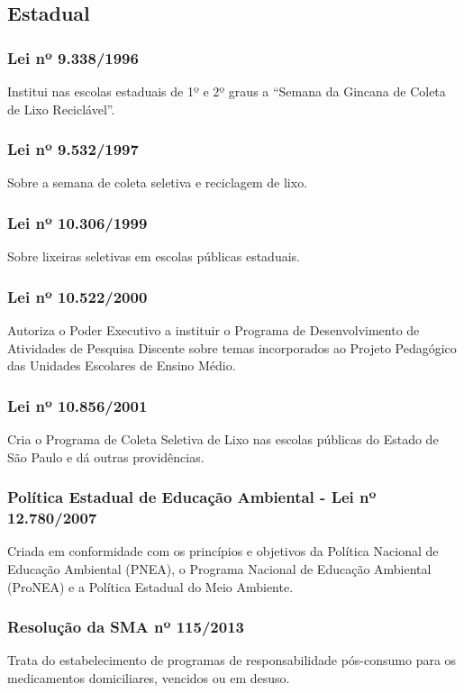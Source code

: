 \begin{subapend}
	\subsection{Estadual}
	\begin{subsubapend}
		\item \subsubsection{Lei nº 9.338/1996}
		Institui nas escolas estaduais de 1º e 2º graus a “Semana da Gincana de Coleta de Lixo Reciclável”.
		\subsubsection{Lei nº 9.532/1997}
		Sobre a semana de coleta seletiva e reciclagem de lixo.
		\subsubsection{Lei nº 10.306/1999}
		Sobre lixeiras seletivas em escolas públicas estaduais.
		\subsubsection{Lei nº 10.522/2000}
		Autoriza o Poder Executivo a instituir o Programa de Desenvolvimento de Atividades de Pesquisa Discente sobre temas incorporados ao Projeto Pedagógico das Unidades Escolares de Ensino Médio.
		\subsubsection{Lei nº 10.856/2001}
		Cria o Programa de Coleta Seletiva de Lixo nas escolas públicas do Estado de São Paulo e dá outras providências.
		\subsubsection{Política Estadual de Educação Ambiental - Lei nº 12.780/2007}
		Criada em conformidade com os princípios e objetivos da Política Nacional de Educação Ambiental (PNEA), o Programa Nacional de Educação Ambiental (ProNEA) e a Política Estadual do Meio Ambiente.
		\subsubsection{Resolução da SMA nº 115/2013}
		Trata do estabelecimento de programas de responsabilidade pós-consumo para os medicamentos domiciliares, vencidos ou em desuso.
	\end{subsubapend}
\end{subapend}

